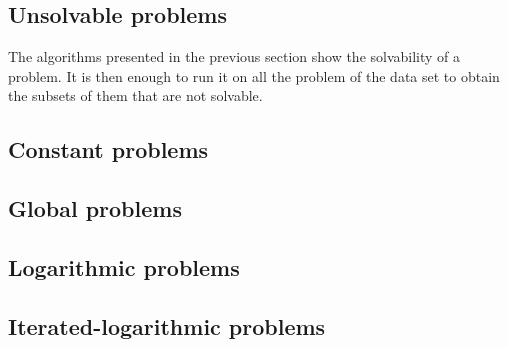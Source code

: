 \documentclass{article}
\theoremstyle{definition}
\begin{document}
\subsection{Unsolvable problems}
The algorithms presented in the previous section show the solvability of a problem. It is then enough to run it on all the problem of the data set to obtain the subsets of them that are not solvable. 
\subsection{Constant problems}

\subsection{Global problems}
\subsection{Logarithmic problems}
\subsection{Iterated-logarithmic problems}
\end{document}
